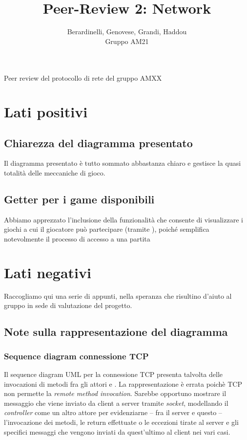 \documentclass[12pt]{article}
\title{Peer-Review 2: Network}
\author{Berardinelli, Genovese, Grandi, Haddou\\Gruppo AM21}
\newcommand*\ttvar[1]{\texttt{\expandafter\dottvar\detokenize{#1}\relax}}
\newcommand*\dottvar[1]{\ifx\relax#1\else
  \expandafter\ifx\string.#1\string.\allowbreak\else#1\fi
  \expandafter\dottvar\fi}
\begin{document}
\maketitle
\begin{center}
Peer review del protocollo di rete del gruppo AMXX 
\end{center}

\tableofcontents
\newpage

\section{Lati positivi}
\subsection{Chiarezza del diagramma presentato}
Il diagramma presentato è tutto sommato abbastanza chiaro e gestisce la quasi totalità delle meccaniche di gioco. 

\subsection{Getter per i game disponibili}
Abbiamo apprezzato l'inclusione della funzionalità che consente di visualizzare i giochi a cui il giocatore può partecipare (tramite \ttvar{getGameIds()}), poiché semplifica notevolmente il processo di accesso a una partita

\section{Lati negativi}
Raccogliamo qui una serie di appunti, nella speranza che risultino d'aiuto al gruppo in sede di valutazione del progetto.  

\subsection{Note sulla rappresentazione del diagramma}
 \subsubsection{Sequence diagram connessione TCP}
 Il sequence diagram UML per la connessione TCP presenta talvolta delle invocazioni di metodi fra gli attori \ttvar{Client} e \ttvar{Server}. La rappresentazione è errata poichè TCP non permette la \textit{remote method invocation}. Sarebbe opportuno mostrare il messaggio che viene inviato da client a server tramite \textit{socket}, modellando il \textit{controller} come un altro attore per evidenziarne -- fra il server e questo -- l'invocazione dei metodi, le return effettuate o le eccezioni tirate al server e gli specifici messaggi che vengono inviati da quest'ultimo al client nei vari casi.
\end{document}
